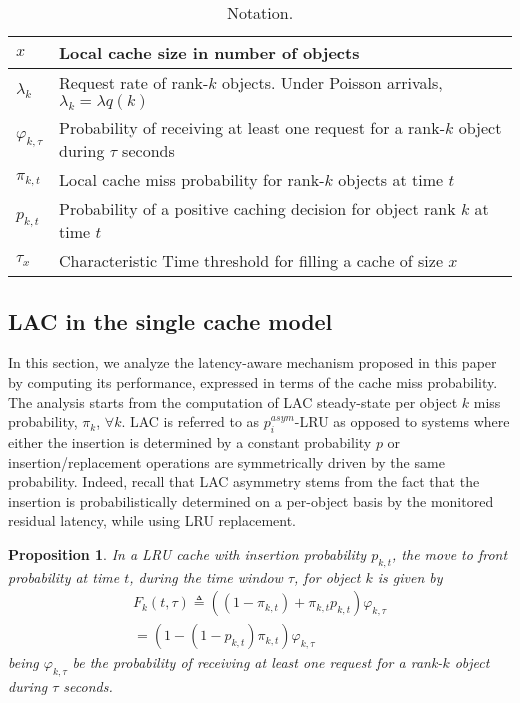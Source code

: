 \documentclass[conference]{IEEEtran}
\newtheorem{proposition}{Proposition}
\begin{document}
\begin{table}[htb!]
\begin{footnotesize}
\centering
\begin{tabular}{|l||p{7cm}|}
\hline
$x$ & Local cache size in number of objects\\
\hline
$\lambda_k$ & Request rate of rank-$k$ objects. Under Poisson arrivals, $\lambda_k = \lambda q(k)$\\
\hline
$\varphi_{k,\tau}$ & Probability of receiving at least one request for a rank-$k$ object during $\tau$ seconds\\
\hline
$\pi_{k,t}$ & Local cache miss probability for rank-$k$ objects at time $t$\\
\hline
$p_{k,t}$ & Probability of a positive caching decision for object rank $k$ at time $t$\\
\hline
$\tau_x$ & Characteristic Time threshold for filling a cache of size $x$\\
\hline
\end{tabular}
\caption{Notation.}\label{tab:symbols}
\end{footnotesize}
\end{table}

\subsection{LAC in the single cache model} \label{sec:single_cache}
In this section, we analyze the latency-aware mechanism proposed in this paper
by computing its performance, expressed in terms of the cache miss probability.
The analysis starts from the computation of LAC steady-state per object $k$
miss probability, $\pi_k$, $\forall k$. LAC is referred to as $p_i^{asym}$-LRU 
as opposed to systems where either the insertion is determined by a constant 
probability $p$ or insertion/replacement operations are symmetrically driven 
by the same probability. Indeed, recall that LAC asymmetry stems from the fact 
that the insertion is probabilistically determined on a per-object basis by the 
monitored residual latency, while using LRU replacement.

\begin{proposition} \label{prop:MTF_arrival_process}
In a LRU cache with insertion probability $p_{k,t}$, 
the move to front probability at time $t$, during the time window $\tau$, 
for object $k$ is given by
\begin{align}
F_k(t, \tau) \triangleq \left((1 - \pi_{k,t}) + \pi_{k,t}p_{k,t} \right)\varphi_{k,\tau} \\
= \left(1 -   (1-p_{k,t})\pi_{k,t} \right)\varphi_{k,\tau}
\end{align}
being  $\varphi_{k,\tau}$ be the probability of receiving at least one request for a 
rank-$k$ object during $\tau$ seconds.
\end{proposition}
\end{document}
